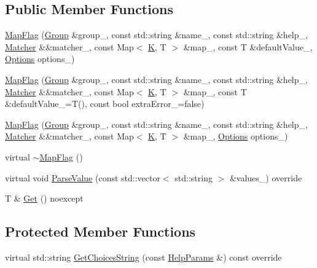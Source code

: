 \subsection*{Public Member Functions}
\begin{DoxyCompactItemize}
\item 
\hyperlink{classargs_1_1_map_flag_a36a375239e115d9923db2908330b4f75}{Map\+Flag} (\hyperlink{classargs_1_1_group}{Group} \&group\+\_\+, const std\+::string \&name\+\_\+, const std\+::string \&help\+\_\+, \hyperlink{classargs_1_1_matcher}{Matcher} \&\&matcher\+\_\+, const Map$<$ \hyperlink{cgal__test_8cpp_a891e241aa245ae63618f03737efba309}{K}, T $>$ \&map\+\_\+, const T \&default\+Value\+\_\+, \hyperlink{namespaceargs_aa530c0f95194aa275f49a5f299ac9e77}{Options} options\+\_\+)
\item 
\hyperlink{classargs_1_1_map_flag_a9e13951a327b382cfaa5caf8a0ecd9c9}{Map\+Flag} (\hyperlink{classargs_1_1_group}{Group} \&group\+\_\+, const std\+::string \&name\+\_\+, const std\+::string \&help\+\_\+, \hyperlink{classargs_1_1_matcher}{Matcher} \&\&matcher\+\_\+, const Map$<$ \hyperlink{cgal__test_8cpp_a891e241aa245ae63618f03737efba309}{K}, T $>$ \&map\+\_\+, const T \&default\+Value\+\_\+=T(), const bool extra\+Error\+\_\+=false)
\item 
\hyperlink{classargs_1_1_map_flag_a2da594dc6378fcaeca63e1dcb8b4d816}{Map\+Flag} (\hyperlink{classargs_1_1_group}{Group} \&group\+\_\+, const std\+::string \&name\+\_\+, const std\+::string \&help\+\_\+, \hyperlink{classargs_1_1_matcher}{Matcher} \&\&matcher\+\_\+, const Map$<$ \hyperlink{cgal__test_8cpp_a891e241aa245ae63618f03737efba309}{K}, T $>$ \&map\+\_\+, \hyperlink{namespaceargs_aa530c0f95194aa275f49a5f299ac9e77}{Options} options\+\_\+)
\item 
virtual \hyperlink{classargs_1_1_map_flag_a67afdb4326dcef52941a230fc188d54b}{$\sim$\+Map\+Flag} ()
\item 
virtual void \hyperlink{classargs_1_1_map_flag_a1f21b9227ab9b346b86f8533213a8272}{Parse\+Value} (const std\+::vector$<$ std\+::string $>$ \&values\+\_\+) override
\item 
T \& \hyperlink{classargs_1_1_map_flag_ad4f1db59b839e44157c5eba9b482b75c}{Get} () noexcept
\end{DoxyCompactItemize}
\subsection*{Protected Member Functions}
\begin{DoxyCompactItemize}
\item 
virtual std\+::string \hyperlink{classargs_1_1_map_flag_a7fe91b5ef6696b82aa8999884bbf727d}{Get\+Choices\+String} (const \hyperlink{structargs_1_1_help_params}{Help\+Params} \&) const override
\end{DoxyCompactItemize}
